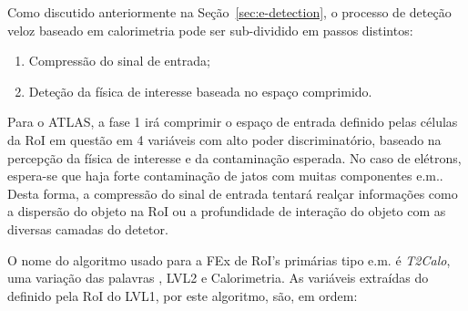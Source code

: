 Como discutido anteriormente na Seção~\ref{sec:e-detection}, o processo de
deteção veloz baseado em calorimetria pode ser sub-dividido em passos distintos:

\begin{enumerate}
\item Compressão do sinal de entrada;
\item Deteção da física de interesse baseada no espaço comprimido.
\end{enumerate}

Para o ATLAS, a fase 1 irá comprimir o espaço de entrada definido pelas
células da RoI em questão em 4 variáveis com alto poder discriminatório, baseado
na percepção da física de interesse e da contaminação esperada. No caso de
elétrons, espera-se que haja forte contaminação de jatos com muitas
componentes e.m.. Desta forma, a compressão do sinal de entrada tentará
realçar informações como a dispersão do objeto na RoI ou a profundidade de
interação do objeto com as diversas camadas do detetor. 

O nome do algoritmo usado para a FEx de RoI's primárias tipo e.m. é
\emph{T2Calo}, uma variação das palavras , LVL2 e
Calorimetria. As variáveis extraídas do  definido pela RoI do
LVL1, por este algoritmo, são, em ordem:


